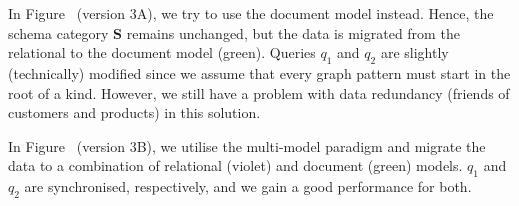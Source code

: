 \begin{example}
In Figure~ (version 3A), we try to use the document model instead. Hence, the schema category $\mathbf{S}$ remains unchanged, but the data is migrated from the relational to the document model (green). Queries $q_1$ and $q_2$ are slightly (technically) modified since we assume that every graph pattern must start in the root of a kind. However, we still have a problem with data redundancy (friends of customers and products) in this solution.



In Figure~ (version 3B), we utilise the multi-model paradigm and migrate the data to a combination of relational (violet) and document (green) models. $q_1$ and $q_2$ are synchronised, respectively, and we gain a good performance for both. 












\end{example}
